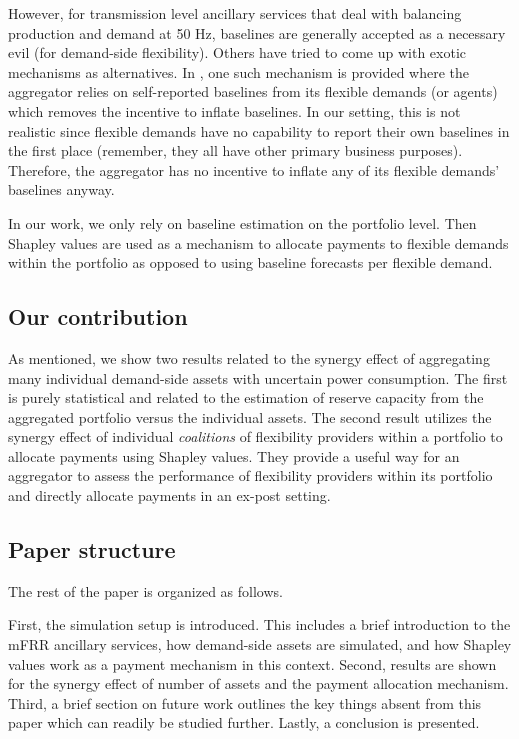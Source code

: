 \documentclass[lettersize,journal]{IEEEtran}
\begin{document}
However, for transmission level ancillary services that deal with balancing production and demand at 50 Hz, baselines are generally accepted as a necessary evil (for demand-side flexibility). Others have tried to come up with exotic mechanisms as alternatives. In \cite{muthirayan2019mechanism}, one such mechanism is provided where the aggregator relies on self-reported baselines from its flexible demands (or agents) which removes the incentive to inflate baselines. In our setting, this is not realistic since flexible demands have no capability to report their own baselines in the first place (remember, they all have other primary business purposes). Therefore, the aggregator has no incentive to inflate any of its flexible demands' baselines anyway. 

In our work, we only rely on baseline estimation on the portfolio level. Then Shapley values \cite{shapley1997value} are used as a mechanism to allocate payments to flexible demands within the portfolio as opposed to using baseline forecasts per flexible demand.


\subsection{Our contribution}

As mentioned, we show two results related to the synergy effect of aggregating many individual demand-side assets with uncertain power consumption. The first is purely statistical and related to the estimation of reserve capacity from the aggregated portfolio versus the individual assets. The second result utilizes the synergy effect of individual \textit{coalitions} of flexibility providers within a portfolio to allocate payments using Shapley values. They provide a useful way for an aggregator to assess the performance of flexibility providers within its portfolio and directly allocate payments in an ex-post setting.

\subsection{Paper structure}

The rest of the paper is organized as follows.

First, the simulation setup is introduced. This includes a brief introduction to the mFRR ancillary services, how demand-side assets are simulated, and how Shapley values work as a payment mechanism in this context. Second, results are shown for the synergy effect of number of assets and the payment allocation mechanism. Third, a brief section on future work outlines the key things absent from this paper which can readily be studied further. Lastly, a conclusion is presented.
\end{document}

